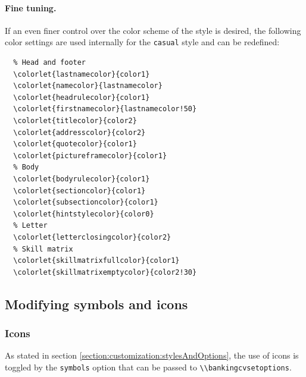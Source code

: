 \documentclass[a4paper, 11pt]{article}
\newcommand{\code}[1]{\lstinline!#1!}
\begin{document}
\paragraph{Fine tuning.}
If an even finer control over the color scheme of the style is desired, the following color settings are used internally for the \code{casual} style and can be redefined:
\begin{lstlisting}
  % Head and footer
  \colorlet{lastnamecolor}{color1}
  \colorlet{namecolor}{lastnamecolor}
  \colorlet{headrulecolor}{color1}
  \colorlet{firstnamecolor}{lastnamecolor!50}
  \colorlet{titlecolor}{color2}
  \colorlet{addresscolor}{color2}
  \colorlet{quotecolor}{color1}
  \colorlet{pictureframecolor}{color1}
  % Body
  \colorlet{bodyrulecolor}{color1}
  \colorlet{sectioncolor}{color1}
  \colorlet{subsectioncolor}{color1}
  \colorlet{hintstylecolor}{color0}
  % Letter
  \colorlet{letterclosingcolor}{color2}
  % Skill matrix
  \colorlet{skillmatrixfullcolor}{color1}
  \colorlet{skillmatrixemptycolor}{color2!30}
\end{lstlisting}


\subsection{Modifying symbols and icons}
\subsubsection{Icons}\label{icon:usage}
As stated in section \ref{section:customization:stylesAndOptions}, the use of icons is toggled by the \code{symbols} option that can be passed to \code{\\bankingcvsetoptions}.
\end{document}
